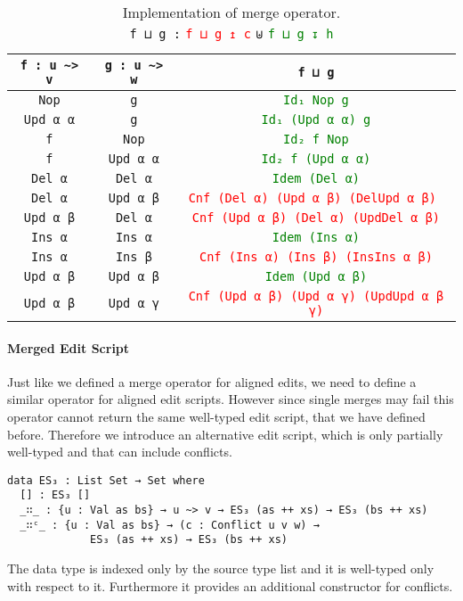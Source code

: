 \documentclass[preprint]{sigplanconf}
\begin{document}
	\begin{table*}[t]
	\centering
	\begin{tabular}{| c | c | c |}
	\hline
	\texttt{f : u \textasciitilde> v} & \texttt{g : u \textasciitilde> w} &  \texttt{f ⊔ g} 
	\\ \hline
	\texttt{Nop} & \texttt{g} & \textcolor{Green}{\texttt{Id₁ Nop g}} 
	\\ \hline
	\texttt{Upd α α} & \texttt{g} & \textcolor{Green}{\texttt{Id₁ (Upd α α) g}} 
	\\ \hline
	\texttt{f} & \texttt{Nop} & \textcolor{Green}{\texttt{Id₂ f Nop}} 
	\\ \hline
	\texttt{f} & \texttt{Upd α α} & \textcolor{Green}{\texttt{Id₂ f (Upd α α)}} 
	\\ \hline
	\texttt{Del α} & \texttt{Del α} & \textcolor{Green}{\texttt{Idem (Del α)}}
	\\ \hline
	\texttt{Del α} & \texttt{Upd α β} & \textcolor{Red}{\texttt{Cnf (Del α) (Upd α β) (DelUpd α β) }}
	\\ \hline
	\texttt{Upd α β} & \texttt{Del α} & \textcolor{Red}{\texttt{Cnf (Upd α β) (Del α) (UpdDel α β)}}
	\\ \hline
	\texttt{Ins α} & \texttt{Ins α} & \textcolor{Green}{\texttt{Idem (Ins α)}} 
	\\	\hline
	\texttt{Ins α} & \texttt{Ins β} & \textcolor{Red}{\texttt{Cnf (Ins α) (Ins β) (InsIns α β)}}
	\\	\hline
	\texttt{Upd α β} & \texttt{Upd α β} & \textcolor{Green}{\texttt{Idem (Upd α β)}}
	\\	\hline
	\texttt{Upd α β} & \texttt{Upd α γ} & \textcolor{Red}{\texttt{Cnf (Upd α β) (Upd α γ) (UpdUpd α β γ)}}
	\\ \hline
	\end{tabular}
	
	\captionsetup{singlelinecheck=false, justification=centering}

	\caption{Implementation of merge operator. \\
	 \texttt{f ⊔ g :} \textcolor{Red}{\texttt{f ⊔ g ↥ c}} \texttt{⊎} \textcolor{Green}{\texttt{f ⊔ g ↧ h}}}	 
	\label{table:merge}
	\end{table*}

	\paragraph{Merged Edit Script}
	Just like we defined a merge operator for aligned edits, we need to 
	define a similar operator for aligned edit scripts.
	However since single merges may fail this operator cannot return 
	the same well-typed edit script, that we have defined before.
	Therefore we introduce an alternative edit script, which is only partially 
	well-typed and that can include conflicts.
\begin{verbatim}
data ES₃ : List Set → Set where
  [] : ES₃ []
  _∷_ : {u : Val as bs} → u ~> v → ES₃ (as ++ xs) → ES₃ (bs ++ xs)
  _∷ᶜ_ : {u : Val as bs} → (c : Conflict u v w) → 
             ES₃ (as ++ xs) → ES₃ (bs ++ xs)
\end{verbatim}
	The data type is indexed only by the source type list and it is well-typed
	only with respect to it. Furthermore it provides an additional constructor
	for conflicts. 
\end{document}
